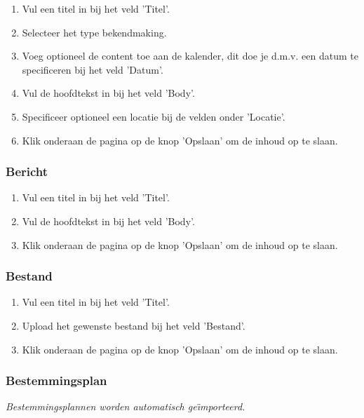 \begin{enumerate}
\item Vul een titel in bij het veld 'Titel'.
\item Selecteer het type bekendmaking.
\item Voeg optioneel de content toe aan de kalender, dit doe je d.m.v. een datum te specificeren bij het veld 'Datum'.
\item Vul de hoofdtekst in bij het veld 'Body'.
\item Specificeer optioneel een locatie bij de velden onder 'Locatie'.
\item Klik onderaan de pagina op de knop 'Opslaan' om de inhoud op te slaan.
\end{enumerate}

\subsubsection{Bericht}\label{bericht}

\begin{enumerate}
\item Vul een titel in bij het veld 'Titel'.
\item Vul de hoofdtekst in bij het veld 'Body'.
\item Klik onderaan de pagina op de knop 'Opslaan' om de inhoud op te slaan.
\end{enumerate}

\subsubsection{Bestand}\label{bestand}

\begin{enumerate}
\item Vul een titel in bij het veld 'Titel'.
\item Upload het gewenste bestand bij het veld 'Bestand'.
\item Klik onderaan de pagina op de knop 'Opslaan' om de inhoud op te slaan.
\end{enumerate}

\subsubsection{Bestemmingsplan}\label{bestemmingsplan}

\emph{Bestemmingsplannen worden automatisch ge{\"\i}mporteerd.}

